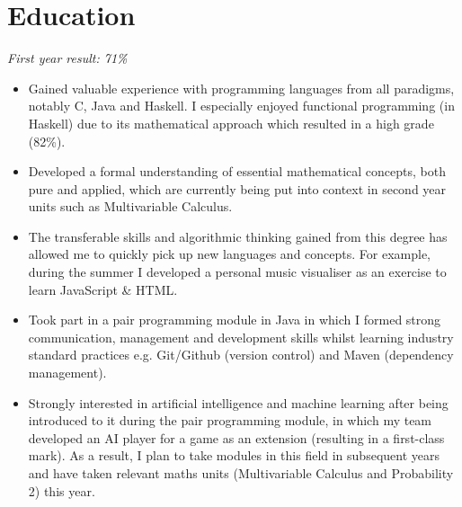 \documentclass{cvclass}
\begin{document}
\titlespacing*{\subsection}{0pt}{\baselineskip}{1pt}
\address{Flat 7, 5-6 Clifton Down Road, Bristol, BS8 4AG}
\address{Email: sollyvarcoe@gmail.com, Mobile: 07908911995}
\address{Github: www.github.com/sollyvarcoe}
\section{Education}
\newline
\indent\indent\textit{First year result: 71\%}
\begin{itemize}
  \item Gained valuable experience with programming languages from all paradigms, notably C, Java and Haskell. I especially enjoyed functional programming (in Haskell) due to its mathematical approach which resulted in a high grade (82\%).
  \item Developed a formal understanding of essential mathematical concepts, both pure and applied, which are currently being put into context in second year units such as Multivariable Calculus.
  \item The transferable skills and algorithmic thinking gained from this degree has allowed me to quickly pick up new languages and concepts. For example, during the summer I developed a personal music visualiser as an exercise to learn JavaScript \& HTML.
  \item Took part in a pair programming module in Java in which I formed strong communication, management and development skills whilst learning industry standard practices e.g. Git/Github (version control) and Maven (dependency management).
  \item Strongly interested in artificial intelligence and machine learning after being introduced to it during the pair programming module, in which my team developed an AI player for a game as an extension (resulting in a first-class mark). As a result, I plan to take modules in this field in subsequent years and have taken relevant maths units (Multivariable Calculus and Probability 2) this year.

\end{itemize}
\newline
{}\newline
{}\newline
\end{document}
